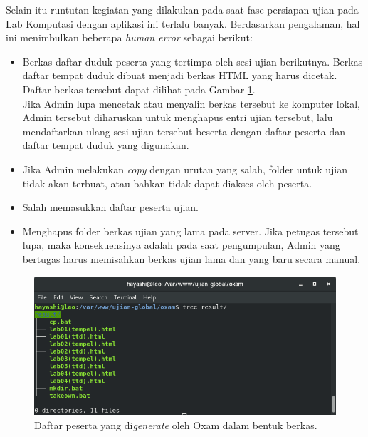 Selain itu runtutan kegiatan yang dilakukan pada saat fase persiapan ujian pada
Lab Komputasi dengan aplikasi ini terlalu banyak. Berdasarkan pengalaman,
hal ini menimbulkan beberapa \textit{human error} sebagai berikut:
    \begin{itemize}
        \item Berkas daftar duduk peserta yang tertimpa oleh sesi ujian
            berikutnya. Berkas daftar tempat duduk dibuat menjadi berkas HTML
            yang harus dicetak. Daftar berkas tersebut dapat dilihat pada Gambar
            \ref{fig:ss-folder-gen}.\\
            Jika Admin lupa mencetak atau menyalin berkas tersebut ke komputer
            lokal, Admin tersebut diharuskan untuk menghapus entri ujian
            tersebut, lalu mendaftarkan ulang sesi ujian tersebut beserta dengan
            daftar peserta dan daftar tempat duduk yang digunakan.

        \item Jika Admin melakukan \textit{copy} dengan urutan yang salah, folder untuk
            ujian tidak akan terbuat, atau bahkan tidak dapat diakses oleh peserta.
        
        \item Salah memasukkan daftar peserta ujian.
        
        \item Menghapus folder berkas ujian yang lama pada server. Jika petugas
            tersebut lupa, maka konsekuensinya adalah pada saat pengumpulan,
            Admin yang bertugas harus memisahkan berkas ujian lama dan yang baru
            secara manual.
    \end{itemize}

\begin{figure}
    \centering
    \includegraphics[width=0.7\paperwidth]{Gambar/ss-struktur-folder-generator.png}
    \caption{Daftar peserta yang di\textit{generate} oleh Oxam dalam bentuk
    berkas.}
    \label{fig:ss-folder-gen}
\end{figure}

